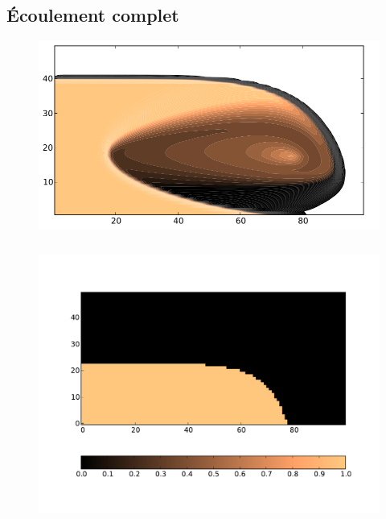 \documentclass[xcolor=dvipsnames]{beamer}
\begin{document}
\subsection{Écoulement complet}
\begin{frame}

\begin{figure}[htp]
\centering
\includegraphics[scale=0.30]{img/centre.png}
\label{}
\end{figure}

\begin{columns}

\begin{column}{6cm}
\begin{figure}[htp]
\centering
\includegraphics[scale=0.25]{img/3Dedge0.pdf}
\label{}
\end{figure}
\end{column}


\end{columns}
\end{frame}
\end{document}
